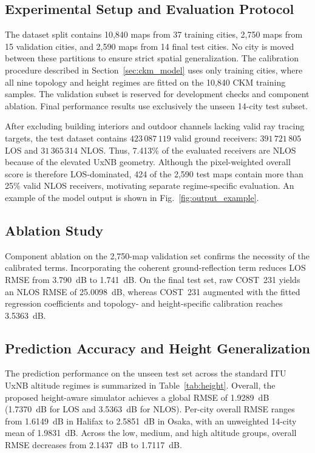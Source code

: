 \documentclass[10pt,conference,letterpaper]{IEEEtran}
\begin{document}
\subsection{Experimental Setup and Evaluation Protocol}
The dataset split contains 10,840 maps from 37 training cities, 2,750 maps from
15 validation cities, and 2,590 maps from 14 final test cities. No city is moved
between these partitions to ensure strict spatial generalization. The
calibration procedure described in Section~\ref{sec:ckm_model} uses only
training cities, where all nine topology and height regimes are fitted on the
10,840 CKM training samples. The validation subset is reserved for development
checks and component ablation. Final performance results use exclusively the
unseen 14-city test subset.

After excluding building interiors and outdoor channels lacking valid ray
tracing targets, the test dataset contains $423\,087\,119$ valid ground
receivers: $391\,721\,805$ LOS and $31\,365\,314$ NLOS. Thus, 7.413\% of the
evaluated receivers are NLOS because of the elevated UxNB geometry. Although
the pixel-weighted overall score is therefore LOS-dominated, 424 of the 2,590
test maps contain more than 25\% valid NLOS receivers, motivating separate
regime-specific evaluation. An example of the model output is shown in
Fig.~\ref{fig:output_example}.

\subsection{Ablation Study}
Component ablation on the 2,750-map validation set confirms the necessity of
the calibrated terms. Incorporating the coherent ground-reflection term reduces
LOS RMSE from \SI{3.790}{dB} to \SI{1.741}{dB}. On the final test set, raw
COST~231 yields an NLOS RMSE of \SI{25.0098}{dB}, whereas COST~231 augmented
with the fitted regression coefficients and topology- and height-specific
calibration reaches \SI{3.5363}{dB}.

\subsection{Prediction Accuracy and Height Generalization}
The prediction performance on the unseen test set across the standard ITU UxNB
altitude regimes is summarized in Table~\ref{tab:height}. Overall, the proposed
height-aware simulator achieves a global RMSE of \SI{1.9289}{dB}
(\SI{1.7370}{dB} for LOS and \SI{3.5363}{dB} for NLOS). Per-city overall RMSE
ranges from \SI{1.6149}{dB} in Halifax to \SI{2.5851}{dB} in Osaka, with an
unweighted 14-city mean of \SI{1.9831}{dB}. Across the low, medium, and high
altitude groups, overall RMSE decreases from \SI{2.1437}{dB} to
\SI{1.7117}{dB}.
\end{document}
